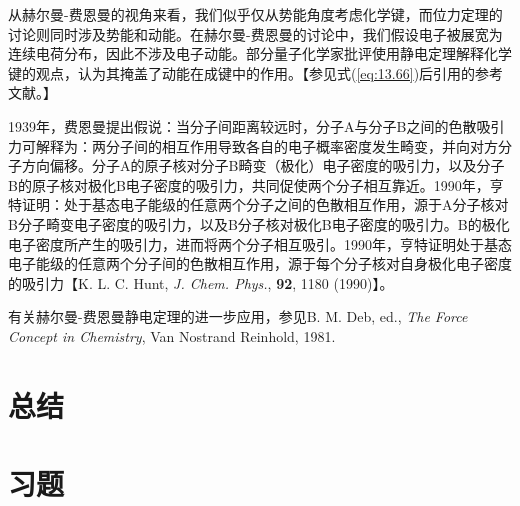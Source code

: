     从赫尔曼-费恩曼的视角来看，我们似乎仅从势能角度考虑化学键，而位力定理的讨论则同时涉及势能和动能。在赫尔曼-费恩曼的讨论中，我们假设电子被展宽为连续电荷分布，因此不涉及电子动能。部分量子化学家批评使用静电定理解释化学键的观点，认为其掩盖了动能在成键中的作用。【参见式(\ref{eq:13.66})后引用的参考文献。】

    1939年，费恩曼提出假说：当分子间距离较远时，分子A与分子B之间的色散吸引力可解释为：两分子间的相互作用导致各自的电子概率密度发生畸变，并向对方分子方向偏移。分子A的原子核对分子B畸变（极化）电子密度的吸引力，以及分子B的原子核对极化B电子密度的吸引力，共同促使两个分子相互靠近。1990年，亨特证明：处于基态电子能级的任意两个分子之间的色散相互作用，源于A分子核对B分子畸变电子密度的吸引力，以及B分子核对极化B电子密度的吸引力。B的极化电子密度所产生的吸引力，进而将两个分子相互吸引。1990年，亨特证明处于基态电子能级的任意两个分子间的色散相互作用，源于每个分子核对自身极化电子密度的吸引力【K. L. C. Hunt, \textit{J. Chem. Phys.}, \textbf{92}, 1180 (1990)】。

    有关赫尔曼-费恩曼静电定理的进一步应用，参见B. M. Deb, ed., \textit{The Force Concept in Chemistry}, Van Nostrand Reinhold, 1981.

\section*{总结}

\section*{习题}